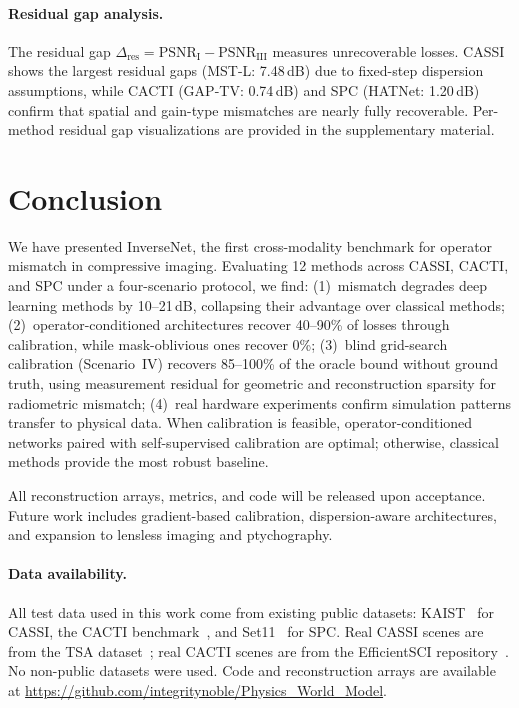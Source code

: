 \documentclass[runningheads]{llncs}
\begin{document}
\paragraph{Residual gap analysis.}
The residual gap $\Delta_{\text{res}} = \text{PSNR}_{\text{I}} - \text{PSNR}_{\text{III}}$ measures unrecoverable losses.
CASSI shows the largest residual gaps (MST-L: 7.48\,dB) due to fixed-step dispersion assumptions, while CACTI (GAP-TV: 0.74\,dB) and SPC (HATNet: 1.20\,dB) confirm that spatial and gain-type mismatches are nearly fully recoverable.
Per-method residual gap visualizations are provided in the supplementary material.

\section{Conclusion}
\label{sec:conclusion}

We have presented InverseNet, the first cross-modality benchmark for operator mismatch in compressive imaging.
Evaluating 12 methods across CASSI, CACTI, and SPC under a four-scenario protocol, we find:
(1)~mismatch degrades deep learning methods by 10--21\,dB, collapsing their advantage over classical methods;
(2)~operator-conditioned architectures recover 40--90\% of losses through calibration, while mask-oblivious ones recover 0\%;
(3)~blind grid-search calibration (Scenario~IV) recovers 85--100\% of the oracle bound without ground truth, using measurement residual for geometric and reconstruction sparsity for radiometric mismatch;
(4)~real hardware experiments confirm simulation patterns transfer to physical data.
When calibration is feasible, operator-conditioned networks paired with self-supervised calibration are optimal; otherwise, classical methods provide the most robust baseline.

All reconstruction arrays, metrics, and code will be released upon acceptance.
Future work includes gradient-based calibration, dispersion-aware architectures, and expansion to lensless imaging and ptychography.

\paragraph{Data availability.}
All test data used in this work come from existing public datasets: KAIST~\cite{choi2017kaist} for CASSI, the CACTI benchmark~\cite{yuan2021snapshot}, and Set11~\cite{kulkarni2016reconnet} for SPC. Real CASSI scenes are from the TSA dataset~\cite{wagadarikar2008cassi}; real CACTI scenes are from the EfficientSCI repository~\cite{wang2023efficientsci}. No non-public datasets were used. Code and reconstruction arrays are available at \url{https://github.com/integritynoble/Physics_World_Model}.
\end{document}
